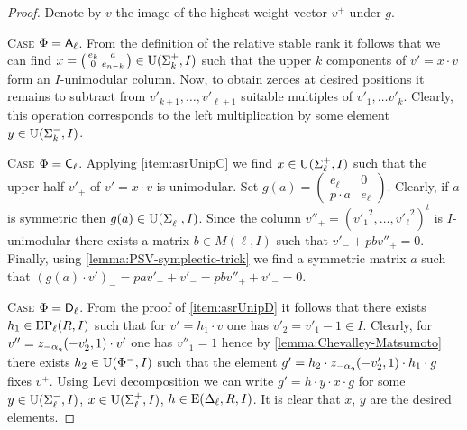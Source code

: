 \begin{proof} Denote by $v$ the image of the highest weight vector $v^+$ under $g$.

\textsc{Case $\Phi=\mathsf{A}_\ell$.} From the definition of the relative stable rank it follows that we can find 
$x= \left(\begin{smallmatrix} e_k & a \\ 0 & e_{n-k} \end{smallmatrix}\right) \in \operatorname{U}(\Sigma_k^+, I)$ such that 
the upper $k$ components of $v'= x \cdot v$ form an $I$-unimodular column. 
Now, to obtain zeroes at desired positions it remains to subtract from $v'_{k+1},\ldots, v'_{\ell+1}$ suitable multiples of $v'_1,\ldots v'_k$.
Clearly, this operation corresponds to the left multiplication by some element $y\in\operatorname{U}(\Sigma_k^-, I)$.

\textsc{Case $\Phi=\mathsf{C}_\ell$.} 
Applying \cref{item:asrUnipC} we find $x \in \operatorname{U}(\Sigma_\ell^+, I)$ such that the upper half $v'_+$ of $v' = x \cdot v$ is unimodular.
Set $g(a) = \left(\begin{smallmatrix} e_\ell & 0 \\ p \cdot a & e_{\ell} \end{smallmatrix}\right)$.
Clearly, if $a$ is symmetric then $g(a) \in \operatorname{U}(\Sigma_\ell^-, I)$.
Since the column $v''_+ = ({v'_1}^2, \ldots, {v'_\ell}^2)^t$ is $I$-unimodular there exists a matrix $b \in M(\ell, I)$ such that $v'_- + p b v''_+ = 0$.
Finally, using \cref{lemma:PSV-symplectic-trick} we find a symmetric matrix $a$ such that $(g(a) \cdot v')_- = p a v'_+ + v'_- = p b v''_+ + v'_- = 0$.

\textsc{Case $\Phi=\mathsf{D}_\ell$.} From the proof of \cref{item:asrUnipD} it follows that there exists $h_1 \in \operatorname{EP}_\ell(R, I)$ such that for $v'=h_1\cdot v$ one has $v'_2=v'_1-1\in I$.
Clearly, for $v'' = z_{-\alpha\ssub{2}}(-v'_2, 1)\cdot v'$ one has $v''_1=1$ hence by \cref{lemma:Chevalley-Matsumoto} there exists $h_2 \in \operatorname{U}(\Phi^-, I)$ such that the element
$g'=h_2 \cdot z_{-\alpha\ssub{2}}(-v'_2, 1) \cdot h_1 \cdot g$ fixes $v^+$. 
Using Levi decomposition we can write $g'=h \cdot y \cdot x \cdot g$ for some $y\in\operatorname{U}(\Sigma^-_\ell, I)$, $x \in \operatorname{U}(\Sigma^+_\ell, I)$, $h\in\operatorname{E}(\Delta_\ell, R, I)$.
It is clear that $x$, $y$ are the desired elements.
\end{proof}